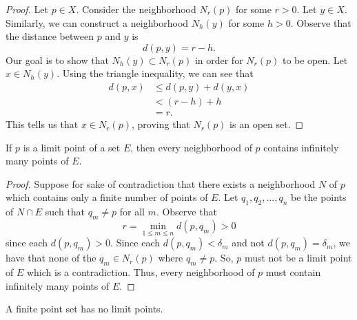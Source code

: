 \documentclass[11pt,a4paper]{book}
\begin{document}
\begin{proof}
Let \( p \in X  \). Consider the neighborhood \( {N}_{r}(p)  \) for some \( r > 0  \). Let \( y \in X  \). Similarly, we can construct a neighborhood \( {N}_{h}(y) \) for some \( h > 0  \). Observe that the distance between \( p \) and \( y \)  is   
\[  d(p,y) = r - h. \]
Our goal is to show that \( {N}_{h}(y) \subset {N}_{r}(p)  \) in order for \( {N}_{r}(p) \) to be open. Let \( x \in {N}_{h}(y) \). Using the triangle inequality, we can see that 
\begin{align*}
    d(p,x) &\leq d(p,y) + d(y,x) \\
           &< (r - h) + h \\
           &= r.
\end{align*}
This tells us that \( x \in {N}_{r}(p) \), proving that \( {N}_{r}(p) \) is an open set.
\end{proof}

\begin{theorem}[ ]
    If \( p  \) is a limit point of a set \( E  \), then every neighborhood of \( p  \) contains infinitely many points of \( E  \).
\end{theorem}
\begin{proof}
Suppose for sake of contradiction that there exists a neighborhood \( N \) of \( p  \) which contains only a finite number of points of \( E  \). Let \( {q}_{1}, {q}_{2}, \dots, {q}_{n} \) be the points of \( N \cap E  \) such that \( {q}_{m} \neq p  \) for all \( m  \). Observe that
\[  r = \min_{1 \leq m \leq n} d(p, {q}_{m}) > 0 \]
since each \( d(p, {q}_{m}) > 0 \). Since each \( d(p, {q}_{m}) < {\delta}_{m }  \) and not \( d(p, {q}_{m}) = {\delta}_{m} \), we have that none of the \( {q}_{m} \in {N}_{r}(p) \) where \( {q}_{m} \neq p  \). So, \( p  \) must not be a limit point of \( E  \) which is a contradiction. Thus, every neighborhood of \( p \) must contain infinitely many points of \( E  \).
\end{proof}

\begin{corollary}
   A finite point set has no limit points. 
\end{corollary}
\end{document}
